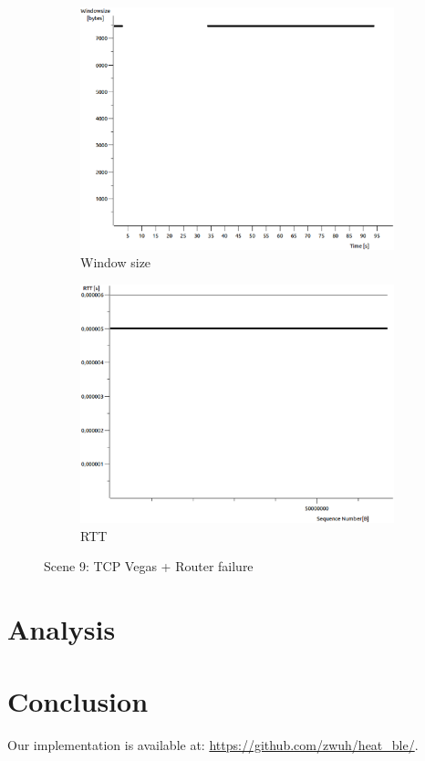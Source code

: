 \documentclass[conference,a4paper]{../../sty/IEEEtran}
\begin{document}
\begin{figure}
\begin{subfigure}[b]{0.2\textwidth}
  \includegraphics[width=\textwidth]{s9-0_wsize}
  \caption{Window size}
 \end{subfigure}
 \begin{subfigure}[b]{0.2\textwidth}
  \includegraphics[width=\textwidth]{s9-0_rtt}
  \caption{RTT}
 \end{subfigure}
 \caption{Scene 9: TCP Vegas + Router failure}
\end{figure}


\section{Analysis}


\section{Conclusion}
Our implementation is available at: \url{https://github.com/zwuh/heat_ble/}.
\end{document}
